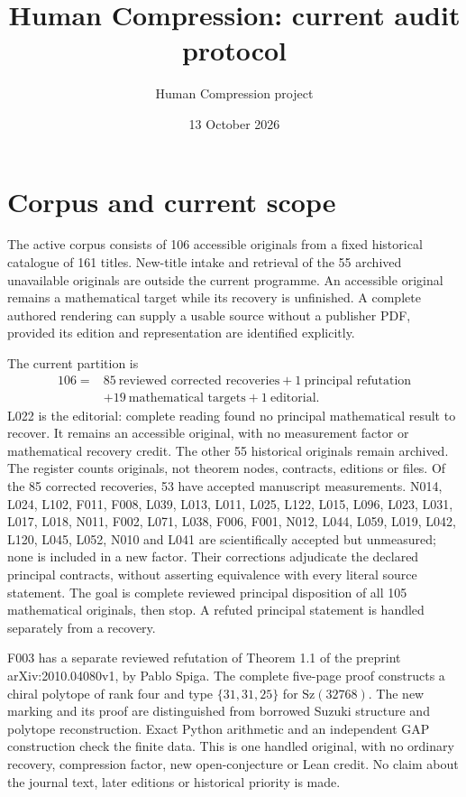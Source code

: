 \documentclass[11pt,a4paper]{article}
\title{Human Compression: current audit protocol}
\author{Human Compression project}
\date{13 October 2026}
\begin{document}
\maketitle

\section{Corpus and current scope}

The active corpus consists of 106 accessible originals from a fixed historical
catalogue of 161 titles. New-title intake and retrieval of the 55 archived
unavailable originals are outside the current programme. An accessible original
remains a mathematical target while its recovery is unfinished. A complete
authored rendering can supply a usable source without a publisher PDF, provided
its edition and representation are identified explicitly.

The current partition is
\[
\begin{aligned}
106={}&85\ \text{reviewed corrected recoveries}+1\ \text{principal refutation}\\
      &+19\ \text{mathematical targets}+1\ \text{editorial}.
\end{aligned}
\]
L022 is the editorial: complete reading found no principal mathematical result
to recover. It remains an accessible original, with no measurement factor or
mathematical recovery credit. The other 55 historical originals remain archived.
The register counts originals, not theorem nodes, contracts, editions or files.
Of the 85 corrected recoveries, 53 have accepted manuscript measurements.
N014, L024, L102, F011, F008, L039, L013, L011, L025, L122, L015, L096, L023, L031, L017, L018, N011, F002, L071, L038, F006, F001, N012, L044, L059, L019, L042, L120, L045, L052, N010 and L041 are scientifically accepted but unmeasured; none is included
in a new factor. Their corrections adjudicate the declared principal contracts,
without asserting equivalence with every literal source statement. The goal
is complete reviewed principal disposition of all 105 mathematical originals,
then stop. A refuted principal statement is handled separately from a recovery.

F003 has a separate reviewed refutation of Theorem 1.1 of the preprint
arXiv:2010.04080v1, by Pablo Spiga. The complete five-page proof constructs a
chiral polytope of rank four and type $\{31,31,25\}$ for $\mathrm{Sz}(32768)$.
The new marking and its proof are distinguished from borrowed Suzuki structure
and polytope reconstruction. Exact Python arithmetic and an independent GAP
construction check the finite data. This is one handled original, with no
ordinary recovery, compression factor, new open-conjecture or Lean credit.
No claim about the journal text, later editions or historical priority is made.
\end{document}
